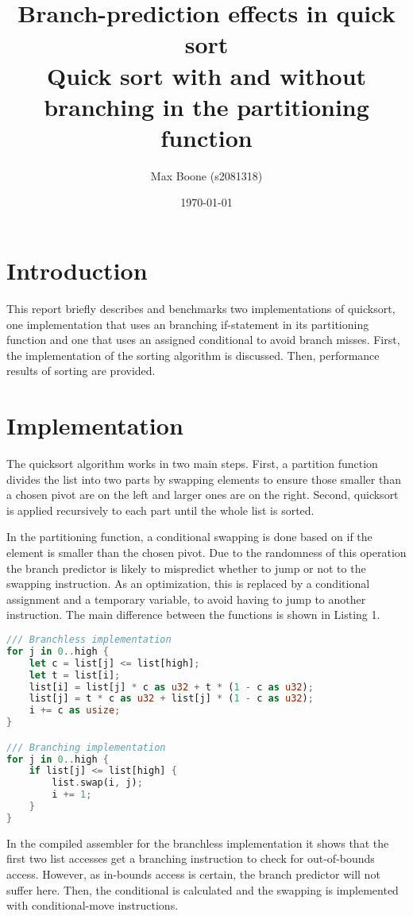 \documentclass[a4paper,10pt]{article}
\title{
  Branch-prediction effects in quick sort \\
\small Quick sort with and without branching in the partitioning function}
\author{Max Boone (s2081318)}
\date{\today}
\begin{document}
\maketitle

\section{Introduction}

This report briefly describes and benchmarks two implementations of
quicksort, one implementation that uses an branching if-statement in
its partitioning function and one that uses an assigned conditional
to avoid branch misses. First, the implementation of the sorting
algorithm is discussed. Then, performance results of sorting are
provided.

\section{Implementation}

The quicksort algorithm works in two main steps. First, a partition
function divides the list into two parts by swapping elements to
ensure those smaller than a chosen pivot are on the left and larger
ones are on the right. Second, quicksort is applied recursively to
each part until the whole list is sorted.

In the partitioning function, a conditional swapping is done based on
if the element is smaller than the chosen pivot. Due to the randomness
of this operation the branch predictor is likely to mispredict whether
to jump or not to the swapping instruction. As an optimization, this is
replaced by a conditional assignment and a temporary variable, to avoid
having to jump to another instruction. The main difference between the
functions is shown in Listing 1.

\begin{lstlisting}[language=rust, caption={Both partitioning implementations in Rust}, captionpos=b]
/// Branchless implementation
for j in 0..high {
    let c = list[j] <= list[high];
    let t = list[i];
    list[i] = list[j] * c as u32 + t * (1 - c as u32);
    list[j] = t * c as u32 + list[j] * (1 - c as u32);
    i += c as usize;
}

/// Branching implementation
for j in 0..high {
    if list[j] <= list[high] {
        list.swap(i, j);
        i += 1;
    }
}
\end{lstlisting}

In the compiled assembler for the branchless implementation it shows that the 
first two list accesses get a branching instruction to check for out-of-bounds
access. However, as in-bounds access is certain, the branch predictor will not
suffer here. Then, the conditional is calculated and the swapping is implemented
with conditional-move instructions.
\end{document}
